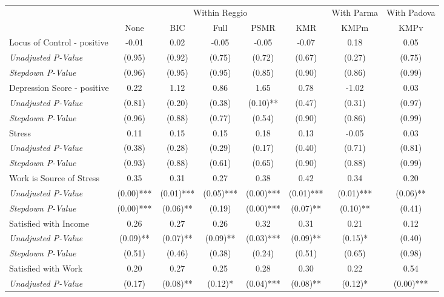 \begin{tabular}{l c c c c c c c}
\toprule
& \multicolumn{5}{c}{Within Reggio} & With Parma & With Padova \\\cmidrule(lr){2-6} \cmidrule(lr){7-7} \cmidrule(lr){8-8}
 & None & BIC & Full & PSMR & KMR & KMPm & KMPv \\
\midrule
Locus of Control - positive & -0.01 & 0.02 & -0.05 & -0.05 & -0.07 & 0.18 & 0.05 \\
\quad \textit{Unadjusted P-Value} & (0.95) & (0.92) & (0.75) & (0.72) & (0.67) & (0.27) & (0.75) \\
\quad \textit{Stepdown P-Value} & (0.96) & (0.95) & (0.95) & (0.85) & (0.90) & (0.86) & (0.99) \\
Depression Score - positive & 0.22 & 1.12 & 0.86 & 1.65 & 0.78 & -1.02 & 0.03 \\
\quad \textit{Unadjusted P-Value} & (0.81) & (0.20) & (0.38) & (0.10)** & (0.47) & (0.31) & (0.97) \\
\quad \textit{Stepdown P-Value} & (0.96) & (0.88) & (0.77) & (0.54) & (0.90) & (0.86) & (0.99) \\
Stress & 0.11 & 0.15 & 0.15 & 0.18 & 0.13 & -0.05 & 0.03 \\
\quad \textit{Unadjusted P-Value} & (0.38) & (0.28) & (0.29) & (0.17) & (0.40) & (0.71) & (0.81) \\
\quad \textit{Stepdown P-Value} & (0.93) & (0.88) & (0.61) & (0.65) & (0.90) & (0.88) & (0.99) \\
Work is Source of Stress & 0.35 & 0.31 & 0.27 & 0.38 & 0.42 & 0.34 & 0.20 \\
\quad \textit{Unadjusted P-Value} & (0.00)*** & (0.01)*** & (0.05)*** & (0.00)*** & (0.01)*** & (0.01)*** & (0.06)** \\
\quad \textit{Stepdown P-Value} & (0.00)*** & (0.06)** & (0.19) & (0.00)*** & (0.07)** & (0.10)** & (0.41) \\
Satisfied with Income & 0.26 & 0.27 & 0.26 & 0.32 & 0.31 & 0.21 & 0.12 \\
\quad \textit{Unadjusted P-Value} & (0.09)** & (0.07)** & (0.09)** & (0.03)*** & (0.09)** & (0.15)* & (0.40) \\
\quad \textit{Stepdown P-Value} & (0.51) & (0.46) & (0.38) & (0.24) & (0.51) & (0.65) & (0.98) \\
Satisfied with Work & 0.20 & 0.27 & 0.25 & 0.28 & 0.30 & 0.22 & 0.54 \\
\quad \textit{Unadjusted P-Value} & (0.17) & (0.08)** & (0.12)* & (0.04)*** & (0.08)** & (0.12)* & (0.00)*** \\

\end{tabular}
